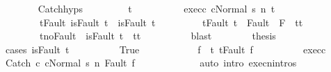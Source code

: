 \begin{isabellebody}
\ \ \ \ \ \ \isamarkupfalse%
\ Catch{\isachardot}hyps\ \isanewline
\ \ \ \ \ \ \isamarkupfalse%
\ t{\isacharprime}\ \ \isanewline
\ \ \ \ \ \ \ \ exec{\isacharunderscore}c{}{\isacharcolon}\ {\isachardoublequoteopen}{\isasymGamma}{\isasymturnstile}{\isasymlangle}c{}{\isacharcomma}Normal\ s{\isacharprime}{\isasymrangle}\ {\isacharequal}n{\isasymRightarrow}\ t{\isacharprime}{\isachardoublequoteclose}\ \ \isanewline
\ \ \ \ \ \ \ \ t{\isacharunderscore}Fault{\isacharcolon}\ {\isachardoublequoteopen}isFault\ t\ {\isasymlongrightarrow}\ isFault\ t{\isacharprime}{\isachardoublequoteclose}\ \isanewline
\ \ \ \ \ \ \ \ t{\isacharprime}{\isacharunderscore}Fault{\isacharcolon}\ {\isachardoublequoteopen}t{\isacharprime}\ {\isasymin}\ Fault\ {\isacharbackquote}\ {\isacharparenleft}{\isacharminus}F{\isacharparenright}\ {\isasymlongrightarrow}\ t{\isacharprime}{\isacharequal}t{\isachardoublequoteclose}\ \isanewline
\ \ \ \ \ \ \ \ t{\isacharprime}{\isacharunderscore}noFault{\isacharcolon}\ {\isachardoublequoteopen}{\isasymnot}\ isFault\ t{\isacharprime}\ {\isasymlongrightarrow}\ t{\isacharprime}{\isacharequal}t{\isachardoublequoteclose}\isanewline
\ \ \ \ \ \ \ \ \isamarkupfalse%
\ blast\isanewline
\ \ \ \ \ \ \isamarkupfalse%
\ {\isacharquery}thesis\isanewline
\ \ \ \ \ \ \isamarkupfalse%
\ {\isacharparenleft}cases\ {\isachardoublequoteopen}isFault\ t{\isacharprime}{\isachardoublequoteclose}{\isacharparenright}\isanewline
\ \ \ \ \ \ \ \ \isamarkupfalse%
\ True\isanewline
\ \ \ \ \ \ \ \ \isamarkupfalse%
\ \isamarkupfalse%
\ f{\isacharprime}\ \ t{\isacharprime}{\isacharcolon}\ {\isachardoublequoteopen}t{\isacharprime}{\isacharequal}Fault\ f{\isacharprime}{\isachardoublequoteclose}\isacommand{{\isachardot}{\isachardot}}\isamarkupfalse%
\isanewline
\ \ \ \ \ \ \ \ \isamarkupfalse%
\ exec{\isacharunderscore}c{}\ \isamarkupfalse%
\ {\isachardoublequoteopen}{\isasymGamma}{\isasymturnstile}{\isasymlangle}Catch\ c{}\ c{}{\isacharcomma}Normal\ s{\isacharprime}{\isasymrangle}\ {\isacharequal}n{\isasymRightarrow}\ Fault\ f{\isacharprime}{\isachardoublequoteclose}\ \isanewline
\ \ \ \ \ \ \ \ \ \ \isamarkupfalse%
\ {\isacharparenleft}auto\ intro{\isacharcolon}\ execn{\isachardot}intros{\isacharparenright}\isanewline
\ \ \ \ \ \ \ \ \isamarkupfalse%

\end{isabellebody}
